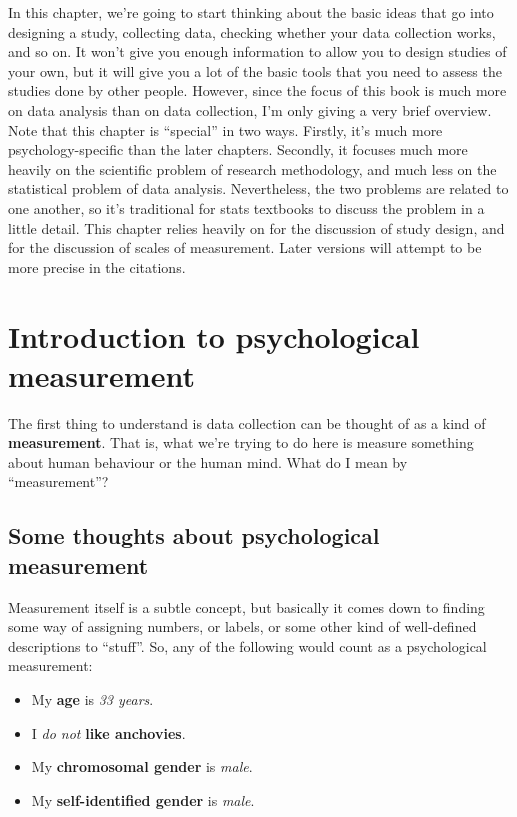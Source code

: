 \documentclass[]{book}
\begin{document}
In this chapter, we're going to start thinking about the basic ideas that go into designing a study, collecting data, checking whether your data collection works, and so on. It won't give you enough information to allow you to design studies of your own, but it will give you a lot of the basic tools that you need to assess the studies done by other people. However, since the focus of this book is much more on data analysis than on data collection, I'm only giving a very brief overview. Note that this chapter is ``special'' in two ways. Firstly, it's much more psychology-specific than the later chapters. Secondly, it focuses much more heavily on the scientific problem of research methodology, and much less on the statistical problem of data analysis. Nevertheless, the two problems are related to one another, so it's traditional for stats textbooks to discuss the problem in a little detail. This chapter relies heavily on \citet{Campbell1963} for the discussion of study design, and \citet{Stevens1946} for the discussion of scales of measurement. Later versions will attempt to be more precise in the citations.

\hypertarget{introduction-to-psychological-measurement}{%
\section{Introduction to psychological measurement}\label{introduction-to-psychological-measurement}}

The first thing to understand is data collection can be thought of as a kind of \textbf{measurement}. That is, what we're trying to do here is measure something about human behaviour or the human mind. What do I mean by ``measurement''?

\hypertarget{some-thoughts-about-psychological-measurement}{%
\subsection{Some thoughts about psychological measurement}\label{some-thoughts-about-psychological-measurement}}

Measurement itself is a subtle concept, but basically it comes down to finding some way of assigning numbers, or labels, or some other kind of well-defined descriptions to ``stuff''. So, any of the following would count as a psychological measurement:

\begin{itemize}
\item
  My {\textbf{age}} is {\emph{33 years}}.
\item
  I {\emph{do not}} {\textbf{like anchovies}}.
\item
  My {\textbf{chromosomal gender}} is {\emph{male}}.
\item
  My {\textbf{self-identified gender}} is {\emph{male}}.
\end{itemize}
\end{document}
